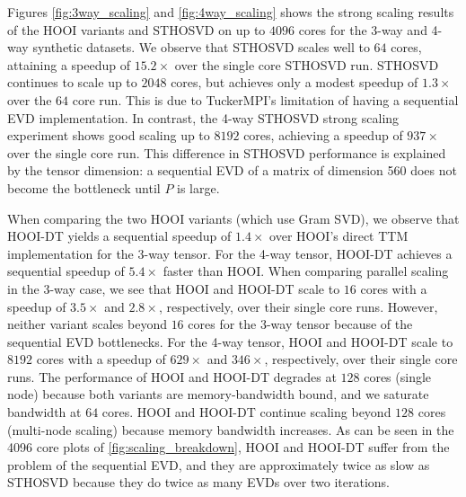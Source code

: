     Figures \ref{fig:3way_scaling} and \ref{fig:4way_scaling} shows the strong
    scaling results of the HOOI variants and STHOSVD on up to $4096$ cores for
    the 3-way and 4-way synthetic datasets. We observe that STHOSVD scales well
    to $64$ cores, attaining a speedup of $15.2\times$ over the single core
    STHOSVD run. STHOSVD continues to scale up to $2048$ cores, but achieves
    only a modest speedup of $1.3\times$ over the $64$ core run. This is due to
    TuckerMPI's limitation of having a sequential EVD implementation. In
    contrast, the 4-way STHOSVD strong scaling experiment shows good scaling up
    to $8192$ cores, achieving a speedup of $937\times$ over the single core
    run. This difference in STHOSVD performance is explained by the tensor
    dimension: a sequential EVD of a matrix of dimension 560 does not become the
    bottleneck until $P$ is large. 

    When comparing the two HOOI variants (which use Gram SVD), we observe that HOOI-DT yields a
    sequential speedup of $1.4\times$ over HOOI's direct TTM implementation for
    the 3-way tensor. For the 4-way tensor, HOOI-DT achieves a sequential
    speedup of $5.4\times$ faster than HOOI. When comparing parallel scaling in
    the 3-way case, we see that HOOI and HOOI-DT scale to $16$ cores with a
    speedup of $3.5\times$ and $2.8\times$, respectively, over their single core
    runs. However, neither variant scales beyond $16$ cores for the 3-way
    tensor because of the sequential EVD bottlenecks. 
    For the 4-way tensor, HOOI and HOOI-DT scale to $8192$ cores with a
    speedup of $629\times$ and $346\times$, respectively, over their single core
    runs.
    The performance of HOOI and HOOI-DT degrades at $128$ cores (single node)
    because both variants are memory-bandwidth bound, and we saturate bandwidth
    at $64$ cores. HOOI and HOOI-DT continue scaling beyond $128$ cores
    (multi-node scaling) because memory bandwidth increases. 
    As can be seen in the 4096 core plots of \cref{fig:scaling_breakdown},
    HOOI and HOOI-DT suffer from the problem of the sequential EVD, and they are approximately twice as
    slow as STHOSVD because they do twice as many EVDs over two iterations.


